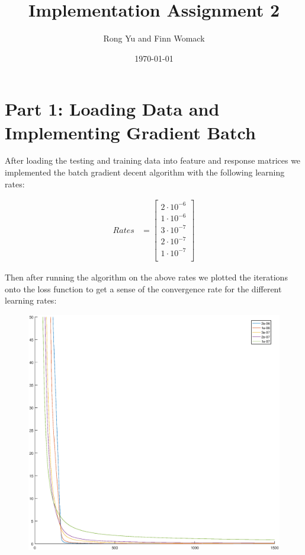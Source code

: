 \documentclass{article}
\title{Implementation Assignment 2}
\date{\today}
\author{Rong Yu and Finn Womack}
\begin{document}
	\maketitle
	\section*{Part 1: Loading Data and Implementing Gradient Batch}
After loading the testing and training data into feature and response matrices we implemented the batch gradient decent algorithm with the following learning rates:
	
	\begin{align}
		Rates &= \begin{bmatrix}
			2 \cdot 10^{-6} \\
			1 \cdot 10^{-6} \\
			3 \cdot 10^{-7} \\
			2 \cdot 10^{-7} \\
			1 \cdot 10^{-7} \\
		\end{bmatrix}
	\end{align}
	
	Then after running the algorithm on the above rates we plotted the iterations onto the loss function to get a sense of the convergence rate for the different learning rates:
	
	\newpage
	
	\begin{figure}[h!]
		\begin{center} 
			\includegraphics[scale=0.4]{learn_rates.eps} 
		\end{center} 
		\label{fig:M1}
	\end{figure}
	
\end{document}
